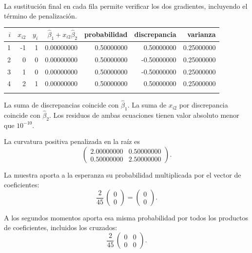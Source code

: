 \documentclass[11pt,a4paper]{article}
\begin{document}
La sustitución final en cada fila permite verificar
los dos gradientes, incluyendo el término de penalización.
\begin{center}\scriptsize
\begin{tabular}{rrrrrrr}\toprule
\(i\)&\(x_{i2}\)&\(y_i\)&\(\widehat\beta_1+x_{i2}\widehat\beta_2\)&probabilidad&discrepancia&varianza\\\midrule
1&-1&1&0.00000000&0.50000000&0.50000000&0.25000000\\
2&0&0&0.00000000&0.50000000&-0.50000000&0.25000000\\
3&1&0&0.00000000&0.50000000&-0.50000000&0.25000000\\
4&2&1&0.00000000&0.50000000&0.50000000&0.25000000\\
\\\bottomrule\end{tabular}\end{center}
La suma de discrepancias coincide con \(\widehat\beta_1\).
La suma de \(x_{i2}\) por discrepancia coincide con
\(\widehat\beta_2\). Los residuos de ambas ecuaciones
tienen valor absoluto menor que \(10^{-10}\).

La curvatura positiva penalizada en la raíz es
\[
\begin{pmatrix}2.00000000&0.50000000\\0.50000000&2.50000000\end{pmatrix}.
\]

La muestra aporta a la esperanza su probabilidad
multiplicada por el vector de coeficientes:
\[
\frac{2}{45}\,\begin{pmatrix}0\\0\end{pmatrix}=\begin{pmatrix}0\\0\end{pmatrix}.
\]

A los segundos momentos aporta esa misma probabilidad
por todos los productos de coeficientes, incluidos los cruzados:
\[
\frac{2}{45}\,\begin{pmatrix}0&0\\0&0\end{pmatrix}.
\]
\end{document}
